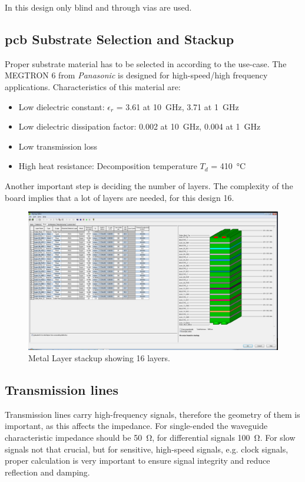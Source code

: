 In this design only blind and through vias are used.

\subsection{\gls{pcb} Substrate Selection and Stackup}
Proper substrate material has to be selected in according to the use-case.
The MEGTRON 6 from \textit{Panasonic} is designed for high-speed/high frequency applications. 
Characteristics of this material are:
\begin{itemize}
\item Low dielectric constant: $\epsilon_r$ = 3.61 at \SI{10}{\giga \hertz}, 3.71 at \SI{1}{\giga \hertz}
\item Low dielectric dissipation factor: 0.002 at \SI{10}{\giga \hertz}, 0.004 at \SI{1}{\giga \hertz}
\item Low transmission loss
\item High heat resistance: Decomposition temperature $T_d$ = \SI{410}{\celsius}
\end{itemize}

Another important step is deciding the number of layers. The complexity of the board implies that a lot of layers are needed, for this design 16.

\begin{figure}[tbh]
	\centering
	\includegraphics[width = \textwidth]{chap/04-work/img/stackup}
	\caption[Metal Layer Stackup]{Metal Layer stackup showing 16 layers.} 
	\label{fig:polaris}
\end{figure}

\subsection{Transmission lines}
Transmission lines carry high-frequency signals, therefore the geometry of them is important, as this affects the impedance.
For single-ended the waveguide characteristic impedance should be \SI{50}{\ohm}, for differential signals \SI{100}{\ohm}.
For slow signals not that crucial, but for sensitive, high-speed signals, e.g. clock signals, proper calculation is very important to ensure signal integrity and reduce reflection and damping. 

